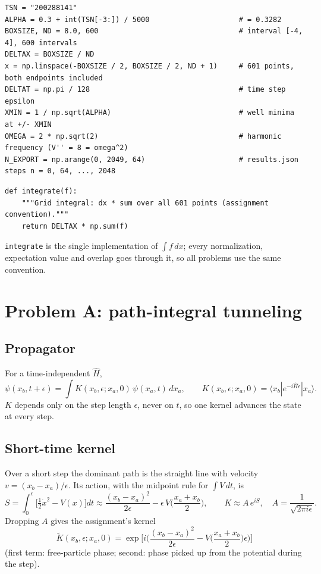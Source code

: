 \documentclass[10pt]{article}
\newcommand{\code}[1]{\texttt{#1}}
\begin{document}
\begin{lstlisting}[firstnumber=7]
TSN = "200288141"
ALPHA = 0.3 + int(TSN[-3:]) / 5000                     # = 0.3282
BOXSIZE, ND = 8.0, 600                                 # interval [-4, 4], 600 intervals
DELTAX = BOXSIZE / ND
x = np.linspace(-BOXSIZE / 2, BOXSIZE / 2, ND + 1)     # 601 points, both endpoints included
DELTAT = np.pi / 128                                   # time step epsilon
XMIN = 1 / np.sqrt(ALPHA)                              # well minima at +/- XMIN
OMEGA = 2 * np.sqrt(2)                                 # harmonic frequency (V'' = 8 = omega^2)
N_EXPORT = np.arange(0, 2049, 64)                      # results.json steps n = 0, 64, ..., 2048
\end{lstlisting}
\begin{lstlisting}[firstnumber=24]
def integrate(f):
    """Grid integral: dx * sum over all 601 points (assignment convention)."""
    return DELTAX * np.sum(f)
\end{lstlisting}
\code{integrate} is the single implementation of $\int f\,dx$; every normalization, expectation value and overlap goes through it, so all problems use the same convention.

\section{Problem A: path-integral tunneling}
\subsection{Propagator}
For a time-independent $\hat H$,
\[
\psi(x_b,t+\epsilon)=\int K(x_b,\epsilon;x_a,0)\,\psi(x_a,t)\,dx_a,\qquad K(x_b,\epsilon;x_a,0)=\langle x_b|e^{-i\hat H\epsilon}|x_a\rangle .
\]
$K$ depends only on the step length $\epsilon$, never on $t$, so one kernel advances the state at every step.

\subsection{Short-time kernel}
Over a short step the dominant path is the straight line with velocity $v=(x_b-x_a)/\epsilon$. Its action, with the midpoint rule for $\int V\,dt$, is
\[
S=\int_0^\epsilon\Big[\tfrac12\dot x^2-V(x)\Big]dt\approx\frac{(x_b-x_a)^2}{2\epsilon}-\epsilon\,V\!\Big(\frac{x_a+x_b}2\Big),
\qquad K\approx A\,e^{iS},\quad A=\frac1{\sqrt{2\pi i\epsilon}} .
\]
Dropping $A$ gives the assignment's kernel
\[
\boxed{\tilde K(x_b,\epsilon;x_a,0)=\exp\Big[i\Big(\frac{(x_b-x_a)^2}{2\epsilon}-V\Big(\frac{x_a+x_b}2\Big)\epsilon\Big)\Big]}
\]
(first term: free-particle phase; second: phase picked up from the potential during the step).
\end{document}
